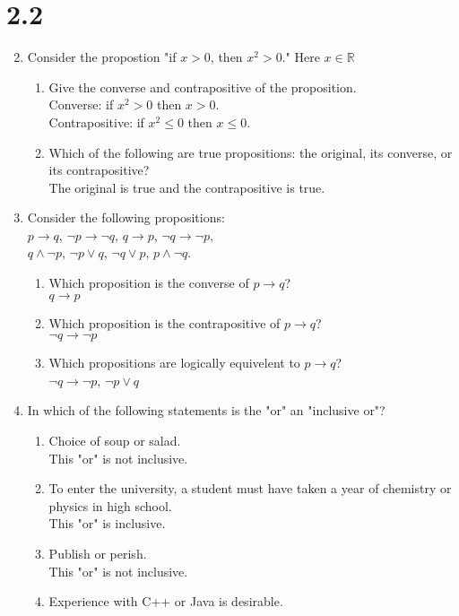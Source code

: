 \documentclass{article}
\newcommand{\R}{\mathbb{R}}
\begin{document}
\section*{2.2} %
\begin{enumerate}
\setcounter{enumi}{1}
\item Consider the propostion "if $x>0$, then $x^2>0$." Here $x\in\R$
	\begin{enumerate}
	\item Give the converse and contrapositive of the proposition.\\
	Converse: if $x^2>0$ then $x>0$.\\
	Contrapositive: if $x^2\leq0$ then $x\leq0$.
	\item Which of the following are true propositions: the original, its converse, or its contrapositive?\\
	The original is true and the contrapositive is true.
	\end{enumerate}
\item Consider the following propositions:\\
$p\to q$, $\neg p\to\neg q$, $q\to p$, $\neg q\to\neg p,$\\
$q\wedge\neg p$, $\neg p\vee q$, $\neg q\vee p$, $p\wedge\neg q$.
	\begin{enumerate}
	\item Which proposition is the converse of $p\to q$?\\
	$q\to p$
	\item Which proposition is the contrapositive of $p\to q$?\\
	$\neg q\to\neg p$
	\item Which propositions are logically equivelent to $p\to q$?\\
	$\neg q\to\neg p$, $\neg p\vee q$
	\end{enumerate}
\setcounter{enumi}{11}
\item In which of the following statements is the "or" an "inclusive or"?
	\begin{enumerate}
	\item Choice of soup or salad.\\
	This "or" is not inclusive.
	\item To enter the university, a student must have taken a year of
	chemistry or physics in high school.\\
	This "or" is inclusive.
	\item Publish or perish.\\
	This "or" is not inclusive.
	\item Experience with C++ or Java is desirable.\\

\end{enumerate}
\end{enumerate}
\end{document}
